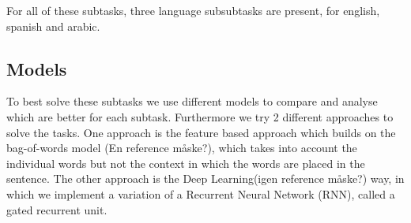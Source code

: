 For all of these subtasks, three language subsubtasks are present, for english, spanish and arabic.\\ 
\subsection{Models}
To best solve these subtasks we use different models to compare and analyse which are better for each subtask. Furthermore we try 2 different approaches to solve the tasks. One approach is the feature based approach which builds on the bag-of-words model (En reference måske?), which takes into account the individual words but not the context in which the words are placed in the sentence. The other approach is the Deep Learning(igen reference måske?) way, in which we implement a variation of a Recurrent Neural Network (RNN), called a gated recurrent unit.